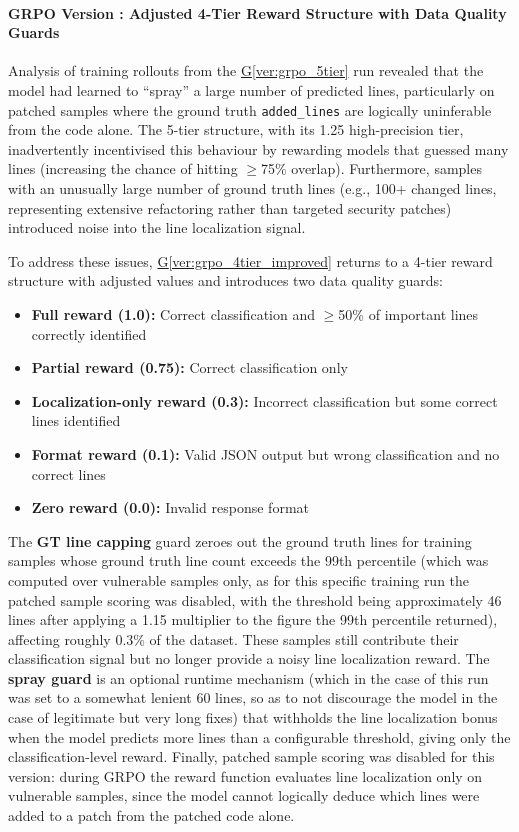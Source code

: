 \documentclass[12pt,a4paper]{article}
\makeatletter
\newcounter{GRPOVer}
\newcommand{\grpoversion}[2]{%
  \stepcounter{GRPOVer}%
  \paragraph{GRPO Version \theGRPOVer: #1}%
  \protected@edef\@currentlabel{\theGRPOVer}\label{#2}%
}
\makeatother
\begin{document}
\grpoversion{Adjusted 4-Tier Reward Structure with Data Quality Guards}{ver:grpo_4tier_improved}

Analysis of training rollouts from the \hyperref[ver:grpo_5tier]{G\ref*{ver:grpo_5tier}} run revealed that the model had learned to ``spray'' a large number of predicted lines, particularly on patched samples where the ground truth \texttt{added\_lines} are logically uninferable from the code alone. The 5-tier structure, with its 1.25 high-precision tier, inadvertently incentivised this behaviour by rewarding models that guessed many lines (increasing the chance of hitting $\geq$75\% overlap). Furthermore, samples with an unusually large number of ground truth lines (e.g., 100+ changed lines, representing extensive refactoring rather than targeted security patches) introduced noise into the line localization signal.

To address these issues, \hyperref[ver:grpo_4tier_improved]{G\ref*{ver:grpo_4tier_improved}} returns to a 4-tier reward structure with adjusted values and introduces two data quality guards:
\begin{itemize}
\item \textbf{Full reward (1.0):} Correct classification and $\geq$50\% of important lines correctly identified
\item \textbf{Partial reward (0.75):} Correct classification only
\item \textbf{Localization-only reward (0.3):} Incorrect classification but some correct lines identified
\item \textbf{Format reward (0.1):} Valid JSON output but wrong classification and no correct lines
\item \textbf{Zero reward (0.0):} Invalid response format
\end{itemize}

The \textbf{GT line capping} guard zeroes out the ground truth lines for training samples whose ground truth line count exceeds the 99th percentile (which was computed over vulnerable samples only, as for this specific training run the patched sample scoring was disabled, with the threshold being approximately 46 lines after applying a 1.15 multiplier to the figure the 99th percentile returned), affecting roughly 0.3\% of the dataset. These samples still contribute their classification signal but no longer provide a noisy line localization reward. The \textbf{spray guard} is an optional runtime mechanism (which in the case of this run was set to a somewhat lenient 60 lines, so as to not discourage the model in the case of legitimate but very long fixes) that withholds the line localization bonus when the model predicts more lines than a configurable threshold, giving only the classification-level reward. Finally, patched sample scoring was disabled for this version: during GRPO the reward function evaluates line localization only on vulnerable samples, since the model cannot logically deduce which lines were added to a patch from the patched code alone.
\end{document}
